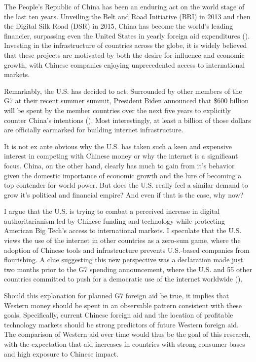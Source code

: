 The People's Republic of China has been an enduring act on the world stage of the last ten years. Unveiling the Belt and Road Initiative (BRI) in 2013 and then the Digital Silk Road (DSR) in 2015, China has become the world's leading financier, surpassing even the United States in yearly foreign aid expenditures (\cite{dreherND}).
Investing in the infrastructure of countries across the globe, it is widely believed that these projects are motivated by both the desire for influence and economic growth, with Chinese companies enjoying unprecedented access to international markets.

Remarkably, the U.S. has decided to act. Surrounded by other members of the G7 at their recent summer summit, President Biden announced that \$600 billion will be spent by the member countries over the next five years to explicitly counter China's intentions (\cite{NPR}). Most interestingly, at least a billion of those dollars are officially earmarked for building internet infrastructure. \nocite{US} \nocite{DSR}

It is not ex ante obvious why the U.S. has taken such a keen and expensive interest in competing with Chinese money or why the internet is a significant focus. China, on the other hand, clearly has much to gain from it's behavior given the domestic importance of economic growth and the lure of becoming a top contender for world power. But does the U.S. really feel a similar demand to grow it's political and financial empire? And even if that is the case, why now?

I argue that the U.S. is trying to combat a perceived increase in digital authoritarianism led by Chinese funding and technology while protecting American Big Tech's access to international markets. I speculate that the U.S. views the use of the internet in other countries as a zero-sum game, where the adoption of Chinese tools and infrastructure prevents U.S.-based companies from flourishing. A clue suggesting this new perspective was a declaration made just two months prior to the G7 spending announcement, where the U.S. and 55 other countries committed to push for a democratic use of the internet worldwide (\cite{Declaration}).

Should this explanation for planned G7 foreign aid be true, it implies that Western money should be spent in an observable pattern consistent with these goals. Specifically, current Chinese foreign aid and the location of profitable technology markets should be strong predictors of future Western foreign aid. The comparison of Western aid over time would thus be the goal of this research, with the expectation that aid increases in countries with strong consumer bases and high exposure to Chinese impact. 

